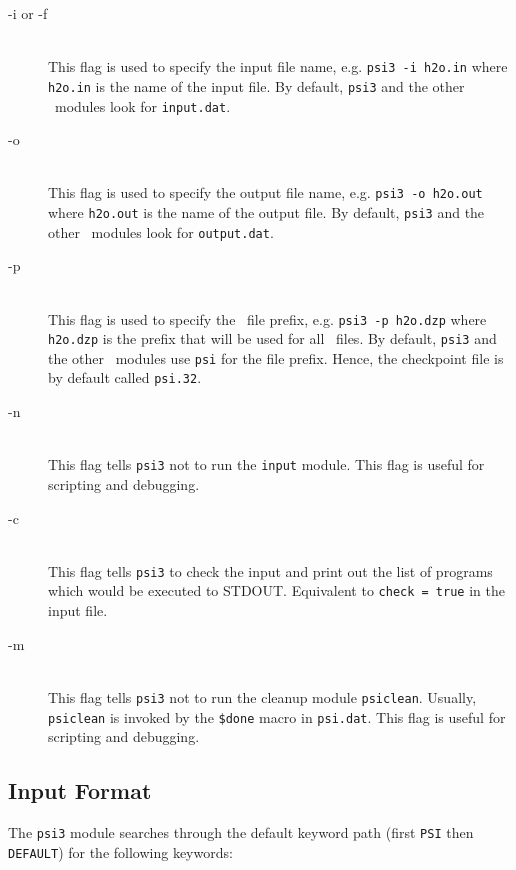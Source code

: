 \begin{description}

\item[-i or -f]\mbox{}\\
This flag is used to specify the input file name, e.g. {\tt psi3 -i
h2o.in} where {\tt h2o.in} is the name of the input file. By default,
{\tt psi3} and the other \PSIthree\ modules look for {\tt input.dat}.

\item[-o]\mbox{}\\
This flag is used to specify the output file name, e.g. {\tt psi3 -o
h2o.out} where {\tt h2o.out} is the name of the output file. By default,
{\tt psi3} and the other \PSIthree\ modules look for {\tt output.dat}.

\item[-p]\mbox{}\\
This flag is used to specify the \PSIthree\ file prefix, e.g. {\tt psi3 -p
h2o.dzp} where {\tt h2o.dzp} is the prefix that will be used for all
\PSIthree\ files. By default, {\tt psi3} and the other \PSIthree\ modules 
use {\tt psi} for the file prefix. Hence, the checkpoint file is by 
default called {\tt psi.32}.

\item[-n]\mbox{}\\
This flag tells {\tt psi3} not to run the {\tt input} module. This
flag is useful for scripting and debugging.

\item[-c]\mbox{}\\
This flag tells {\tt psi3} to check the input and print out the list
of programs which would be executed to STDOUT. Equivalent to 
{\tt check = true} in the input file.

\item[-m]\mbox{}\\
This flag tells {\tt psi3} not to run the cleanup module {\tt psiclean}.
Usually, {\tt psiclean} is invoked by the {\tt \$done} macro in 
{\tt psi.dat}. This flag is useful for scripting and debugging.

\end{description}

\subsection{Input Format}

The {\tt psi3} module searches through the default keyword path 
(first {\tt PSI} then {\tt DEFAULT}) for the following keywords:

